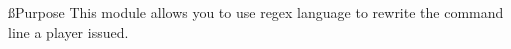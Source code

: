 
\ss{Purpose}
This module allows you to use regex language to rewrite the command line a player issued.